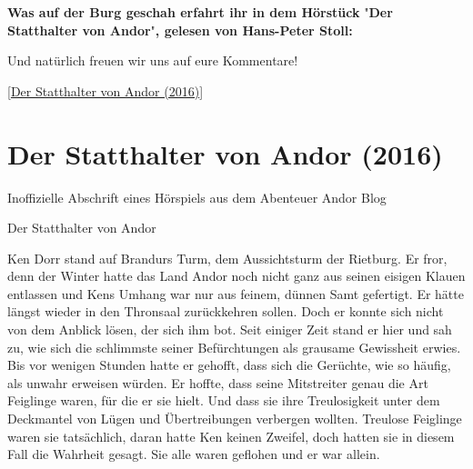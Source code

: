 \documentclass[10pt, a4paper, oneside]{book}
\newcommand{\fillbreak}{\vspace*{\fill}\columnbreak}
\newcommand{\storytext}[1]{%
    \section{#1}%
    \label{Storytext: #1}%
}
\newcommand{\refstorytext}[1]{\hyperref[Storytext: #1]{#1}}
\begin{document}
\begin{multicols}{2}
 

\textbf{Was auf der Burg geschah erfahrt ihr in dem Hörstück }"\textbf{Der Statthalter von Andor}"\textbf{, gelesen von Hans-Peter Stoll:}

Und natürlich freuen wir uns auf eure Kommentare!

[\refstorytext{Der Statthalter von Andor (2016)}]



 


\fillbreak
\storytext{Der Statthalter von Andor (2016)}

\begin{center}
    Inoffizielle Abschrift eines Hörspiels aus dem Abenteuer Andor Blog
\end{center}

Der Statthalter von Andor\bigskip

Ken Dorr stand auf Brandurs Turm, dem Aussichtsturm der Rietburg. Er fror, denn der Winter hatte das Land Andor noch nicht ganz aus seinen eisigen Klauen entlassen und Kens Umhang war nur aus feinem, dünnen Samt gefertigt. Er hätte längst wieder in den Thronsaal zurückkehren sollen. Doch er konnte sich nicht von dem Anblick lösen, der sich ihm bot. Seit einiger Zeit stand er hier und sah zu, wie sich die schlimmste seiner Befürchtungen als grausame Gewissheit erwies. Bis vor wenigen Stunden hatte er gehofft, dass sich die Gerüchte, wie so häufig, als unwahr erweisen würden. Er hoffte, dass seine Mitstreiter genau die Art Feiglinge waren, für die er sie hielt. Und dass sie ihre Treulosigkeit unter dem Deckmantel von Lügen und Übertreibungen verbergen wollten. Treulose Feiglinge waren sie tatsächlich, daran hatte Ken keinen Zweifel, doch hatten sie in diesem Fall die Wahrheit gesagt. Sie alle waren geflohen und er war allein. 


\end{multicols}
\end{document}
